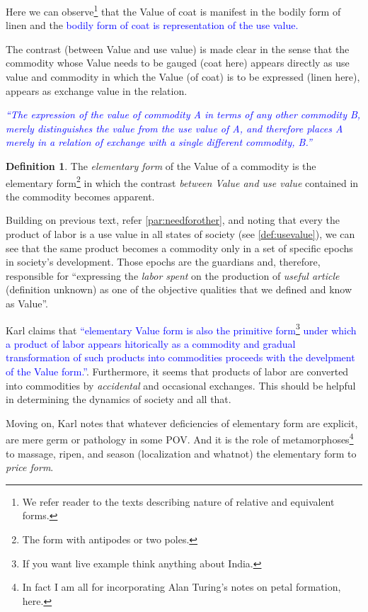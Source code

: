 \documentclass[12pt]{extarticle}
\theoremstyle{definition}
\newtheorem{definition}{Definition}[section]
\begin{document}
 Here we can observe\footnote{We refer reader to the texts describing nature of relative and equivalent forms.} that the Value of coat is manifest in the bodily form of linen and the \textcolor{blue}{bodily form of coat is representation of the use value.}

 The contrast (between Value and use value) is made clear in the sense that the commodity whose Value needs to be gauged (coat here) appears directly as use value and commodity in which the Value (of coat) is to be expressed (linen here), appears as exchange value in the relation.

 \textcolor{blue}{\emph{``The expression of the value of commodity A in terms of any other commodity B, merely
distinguishes the value from the use value of A, and therefore places A merely in a relation of
exchange with a single different commodity, B.''}}

\begin{definition}
  \label{def:elmformval}
    The \emph{elementary form} of the Value of a commodity is the elementary form\footnote{The form with antipodes or two poles.} in which the contrast \emph{between Value and use value} contained in the commodity becomes apparent.
  \end{definition}

  Building on previous text, refer \ref{par:needforother}, and noting that every the product of labor is a use value in all states of society (see \ref{def:usevalue}), we can see that the same product becomes a commodity only in a set of specific epochs in society's development.  Those epochs are the guardians and, therefore, responsible for ``expressing the \emph{labor spent} on the production of \emph{useful article} (definition unknown) as one of the objective qualities that we defined and know as Value''.

  Karl claims that \textcolor{blue}{``elementary Value form is also the primitive form\footnote{If you want live example think anything about India.} under which a product of labor appears hitorically as a commodity and gradual transformation of such products into commodities proceeds with the develpment of the Value form.''}.  Furthermore, it seems that products of labor are converted into commodities by \emph{accidental} and occasional exchanges.  This should be helpful in determining the dynamics of society and all that.

  Moving on, Karl notes that whatever deficiencies of elementary form are explicit, are mere germ or pathology in some POV.  And it is the role of metamorphoses\footnote{In fact I am all for incorporating Alan Turing's notes on petal formation, here.} to massage, ripen, and season (localization and whatnot) the elementary form to \emph{price form}.
\end{document}
